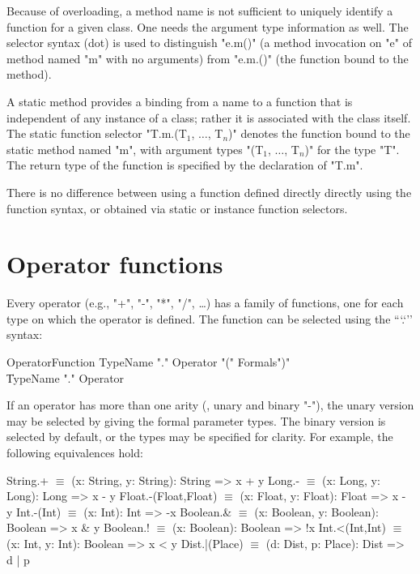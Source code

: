 
Because of overloading, a method name is not sufficient to
uniquely identify a function for a given class.
One needs the argument type information as well.
The selector syntax (dot) is used to distinguish \xcd"e.m()" (a
method invocation on \xcd"e" of method named \xcd"m" with no arguments)
from \xcd"e.m.()"
(the function bound to the method). 

A static method provides a binding from a name to a function that is
independent of any instance of a class; rather it is associated with the
class itself. The static function selector
\xcdmath"T.m.(T$_1$, $\dots$, T$_n$)" denotes the
function bound to the static method named \xcd"m", with argument types
\xcdmath"(T$_1$, $\dots$, T$_n$)" for the type \xcd"T". The return type
of the function is specified by the declaration of \xcd"T.m".

There is no difference between using a function defined directly 
directly using the function syntax, or obtained via static or
instance function selectors.


\section{Operator functions}
\label{OperatorFunction}
Every operator (e.g.,
\xcd"+",
\xcd"-",
\xcd"*",
\xcd"/",
\dots) has a family of functions, one for
each type on which the operator is defined. The function can be
selected using the ``\xcd`.`'' syntax:

\begin{grammar}
OperatorFunction
        \: TypeName \xcd"." Operator \xcd"(" Formals\opt \xcd")" \\
        \| TypeName \xcd"." Operator \\
\end{grammar}

If an operator has more than one arity (\eg, unary and binary
\xcd"-"), the unary version may be selected by giving the
formal parameter types.  The binary version is selected by
default, or the types may be specified for clarity.
For example, the following equivalences hold:

\begin{xtenmath}
String.+             $\equiv$ (x: String, y: String): String => x + y
Long.-               $\equiv$ (x: Long, y: Long): Long => x - y
Float.-(Float,Float) $\equiv$ (x: Float, y: Float): Float => x - y
Int.-(Int)           $\equiv$ (x: Int): Int => -x
Boolean.&            $\equiv$ (x: Boolean, y: Boolean): Boolean => x & y
Boolean.!            $\equiv$ (x: Boolean): Boolean => !x
Int.<(Int,Int)       $\equiv$ (x: Int, y: Int): Boolean => x < y
Dist.|(Place)        $\equiv$ (d: Dist, p: Place): Dist => d | p
\end{xtenmath}



